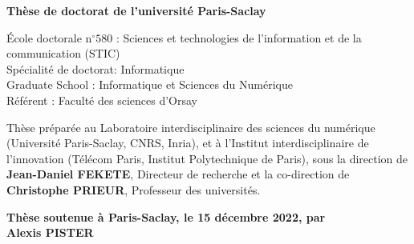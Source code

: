 \documentclass[12pt,a4paper, twoside, headings=small]{book}
\begin{document}
\begin{titlepage}
        \fontsize{8}{12}\selectfont

        \vspace{1.5cm}

        \normalsize
        \textbf{Thèse de doctorat de l'université Paris-Saclay} \\

        \vspace{6mm}

        \small École doctorale n$^{\circ}580$ : Sciences et technologies de l’information et de la communication (STIC)\\
        \small Spécialité de doctorat: Informatique\\
        \small Graduate School : Informatique et Sciences du Numérique\\
        \small Référent : Faculté des sciences d’Orsay \\
        \vspace{6mm}


        \footnotesize Thèse préparée au Laboratoire interdisciplinaire des sciences du numérique (Université Paris-Saclay, CNRS, Inria), et à l'Institut interdisciplinaire de l'innovation (Télécom Paris, Institut Polytechnique de Paris), sous la direction de \textbf{Jean-Daniel FEKETE}, Directeur de recherche et la co-direction de \textbf{Christophe PRIEUR}, Professeur des universités. \\

        \vspace{15mm}

        \textbf{Thèse soutenue à Paris-Saclay, le 15 décembre 2022, par}\\
        \bigskip
        \Large {\color{Prune} \textbf{Alexis PISTER}} %

        \vspace{\fill} %


\end{titlepage}
\end{document}
